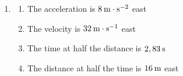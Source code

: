 {\begin{mdframed}[linewidth=4, leftmargin=40, rightmargin=40]
\begin{exercise}
\begin{enumerate}[noitemsep, label=\textbf{Step} \textbf{\arabic*}. ]
\begin{equation}
      \end{equation}
          \item 
\label{m38796*uid081231}\begin{enumerate}[noitemsep, label=\textbf{\alph*}. ] 
            \leftskip=20pt\rightskip=\leftskip\item The acceleration is $8\phantom{\rule{2pt}{0ex}}\mathrm{m}\ensuremath{\cdot}\mathrm{s}{}^{-2}$ east\item The velocity is $32\phantom{\rule{2pt}{0ex}}\mathrm{m}\ensuremath{\cdot}\mathrm{s}{}^{-1}$ east\item The time at half the distance is $2,83\phantom{\rule{2pt}{0ex}}\mathrm{s}$ \item The distance at half the time is $16\phantom{\rule{2pt}{0ex}}\mathrm{m}$ east \end{enumerate}
\end{enumerate}
    \end{exercise}
    \end{mdframed}
    }
    \noindent
\label{m38796*secfhsst!!!underscore!!!id5845}
